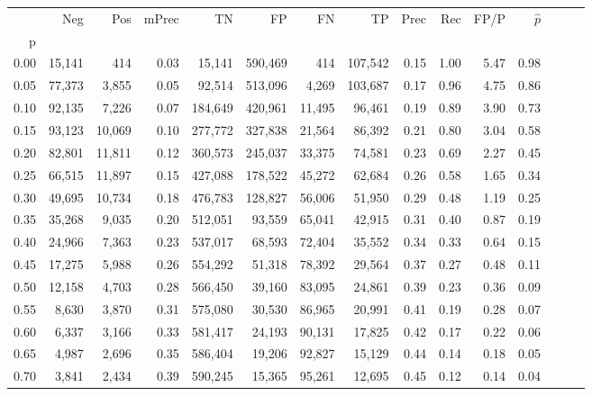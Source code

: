 \begin{tabular}{rrrrrrrrrrrrrrr}
\toprule
{} &     Neg &     Pos & mPrec &       TN &       FP &       FN &       TP &  Prec &   Rec &  FP/P & $\hat{p}$ \\
p    &         &         &       &          &          &          &          &       &       &       &           \\
\midrule
0.00 &  15,141 &     414 &  0.03 &   15,141 &  590,469 &      414 &  107,542 &  0.15 &  1.00 &  5.47 &      0.98 \\
0.05 &  77,373 &   3,855 &  0.05 &   92,514 &  513,096 &    4,269 &  103,687 &  0.17 &  0.96 &  4.75 &      0.86 \\
0.10 &  92,135 &   7,226 &  0.07 &  184,649 &  420,961 &   11,495 &   96,461 &  0.19 &  0.89 &  3.90 &      0.73 \\
0.15 &  93,123 &  10,069 &  0.10 &  277,772 &  327,838 &   21,564 &   86,392 &  0.21 &  0.80 &  3.04 &      0.58 \\
0.20 &  82,801 &  11,811 &  0.12 &  360,573 &  245,037 &   33,375 &   74,581 &  0.23 &  0.69 &  2.27 &      0.45 \\
0.25 &  66,515 &  11,897 &  0.15 &  427,088 &  178,522 &   45,272 &   62,684 &  0.26 &  0.58 &  1.65 &      0.34 \\
0.30 &  49,695 &  10,734 &  0.18 &  476,783 &  128,827 &   56,006 &   51,950 &  0.29 &  0.48 &  1.19 &      0.25 \\
0.35 &  35,268 &   9,035 &  0.20 &  512,051 &   93,559 &   65,041 &   42,915 &  0.31 &  0.40 &  0.87 &      0.19 \\
0.40 &  24,966 &   7,363 &  0.23 &  537,017 &   68,593 &   72,404 &   35,552 &  0.34 &  0.33 &  0.64 &      0.15 \\
0.45 &  17,275 &   5,988 &  0.26 &  554,292 &   51,318 &   78,392 &   29,564 &  0.37 &  0.27 &  0.48 &      0.11 \\
0.50 &  12,158 &   4,703 &  0.28 &  566,450 &   39,160 &   83,095 &   24,861 &  0.39 &  0.23 &  0.36 &      0.09 \\
0.55 &   8,630 &   3,870 &  0.31 &  575,080 &   30,530 &   86,965 &   20,991 &  0.41 &  0.19 &  0.28 &      0.07 \\
0.60 &   6,337 &   3,166 &  0.33 &  581,417 &   24,193 &   90,131 &   17,825 &  0.42 &  0.17 &  0.22 &      0.06 \\
0.65 &   4,987 &   2,696 &  0.35 &  586,404 &   19,206 &   92,827 &   15,129 &  0.44 &  0.14 &  0.18 &      0.05 \\
0.70 &   3,841 &   2,434 &  0.39 &  590,245 &   15,365 &   95,261 &   12,695 &  0.45 &  0.12 &  0.14 &      0.04 \\

\end{tabular}
